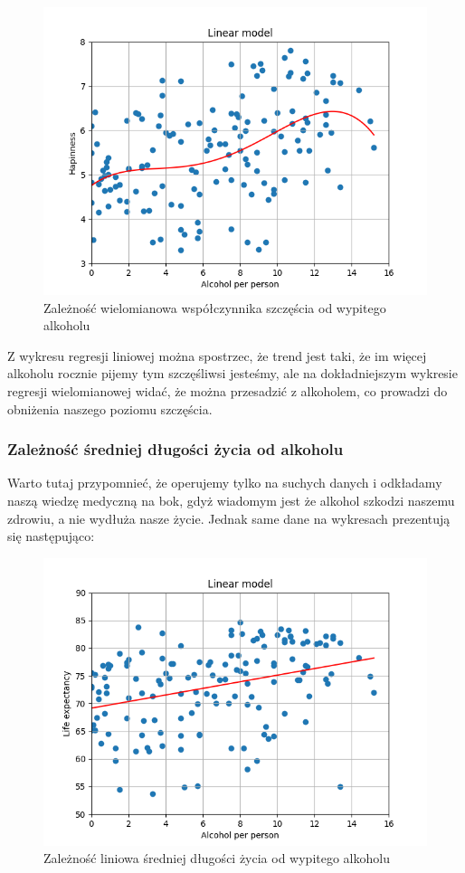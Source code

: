 \documentclass[10pt]{article}
\begin{document}
\begin{figure}[H]
    \begin{center}
        \includegraphics[width=0.8\linewidth]{plots/happiness_dependence_poly.png}
        \caption{Zależność wielomianowa współczynnika szczęścia od wypitego alkoholu}
    \end{center}
\end{figure}

Z wykresu regresji liniowej można spostrzec, że trend jest taki, że im więcej alkoholu rocznie pijemy tym szczęśliwsi jesteśmy, ale na dokładniejszym wykresie regresji wielomianowej widać, że można przesadzić z alkoholem, co prowadzi do obniżenia naszego poziomu szczęścia.

\pagebreak
\subsubsection{Zależność średniej długości życia od alkoholu}
Warto tutaj przypomnieć, że operujemy tylko na suchych danych i odkładamy naszą wiedzę medyczną na bok, gdyż wiadomym jest że alkohol szkodzi naszemu zdrowiu, a nie wydłuża nasze życie.
Jednak same dane na wykresach prezentują się następująco:

\begin{figure}[H]
    \begin{center}
        \includegraphics[width=0.8\linewidth]{plots/life_expectancy_dependence_linear.png}
        \caption{Zależność liniowa średniej długości życia od wypitego alkoholu}
    \end{center}
\end{figure}
\end{document}
